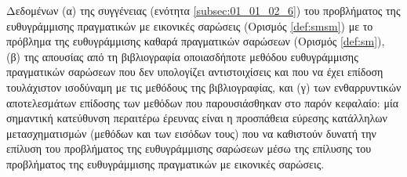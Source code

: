 Δεδομένων (α) της συγγένειας (ενότητα \ref{subsec:01_01_02_6}) του προβλήματος
της ευθυγράμμισης πραγματικών με εικονικές σαρώσεις (Ορισμός \ref{def:smsm}) με
το πρόβλημα της ευθυγράμμισης καθαρά πραγματικών σαρώσεων (Ορισμός
\ref{def:sm}), (β) της απουσίας από τη βιβλιογραφία οποιασδήποτε μεθόδου
ευθυγράμμισης πραγματικών σαρώσεων που δεν υπολογίζει αντιστοιχίσεις και που να
έχει επίδοση τουλάχιστον ισοδύναμη με τις μεθόδους της βιβλιογραφίας, και (γ)
των ενθαρρυντικών αποτελεσμάτων επίδοσης των μεθόδων που παρουσιάσθηκαν στο
παρόν κεφαλαίο: μία σημαντική κατεύθυνση περαιτέρω έρευνας είναι η προσπάθεια
εύρεσης κατάλληλων μετασχηματισμών (μεθόδων και των εισόδων τους) που να
καθιστούν δυνατή την επίλυση του προβλήματος της ευθυγράμμισης σαρώσεων μέσω
της επίλυσης του προβλήματος της ευθυγράμμισης πραγματικών με εικονικές
σαρώσεις.
